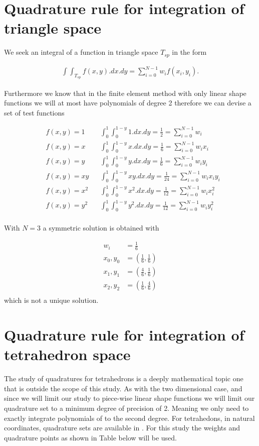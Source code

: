 \documentclass[11pt,letterpaper,titlepage]{article}
\renewcommand{\thefigure}{\arabic{section}.\arabic{figure}}
\newcommand{\beq}{\begin{equation*}
\begin{aligned}}
\newcommand{\eeq}{\end{aligned}
\end{equation*}}
\numberwithin{equation}{section}
\begin{document}
\begin{appendices}
\newpage
\renewcommand{\thefigure}{D\arabic{section}.\arabic{figure}}
\section{Quadrature rule for integration of triangle space} \label{appendix:trianglequadrature}
We seek an integral of a function in triangle space $T_{sp}$ in the form

\beq 
\int \int_{T_{sp}} f(x,y).dx.dy = \sum_{i=0}^{N-1} w_i f(x_i,y_i).
\eeq 

Furthermore we know that in the finite element method with only linear shape functions we will at most have polynomials of degree 2 therefore we can devise a set of test functions

\beq 
&f(x,y) = 1    &&\int_{0}^1 \int_0^{1-y} 1.dx.dy = \frac{1}{2} = \sum_{i=0}^{N-1} w_i\\
&f(x,y) = x    &&\int_{0}^1 \int_0^{1-y} x.dx.dy = \frac{1}{6} = \sum_{i=0}^{N-1} w_i x_i\\
&f(x,y) = y    &&\int_{0}^1 \int_0^{1-y} y.dx.dy = \frac{1}{6} = \sum_{i=0}^{N-1} w_i y_i\\
&f(x,y) = xy  & &\int_{0}^1 \int_0^{1-y} xy.dx.dy = \frac{1}{24} = \sum_{i=0}^{N-1} w_i x_i y_i\\
&f(x,y) = x^2    &&\int_{0}^1 \int_0^{1-y} x^2.dx.dy = \frac{1}{12} = \sum_{i=0}^{N-1} w_i x_i^2\\
&f(x,y) = y^2    &&\int_{0}^1 \int_0^{1-y} y^2.dx.dy = \frac{1}{12} = \sum_{i=0}^{N-1} w_i y_i^2\\
\eeq 

With $N=3$ a symmetric solution is obtained with

\beq
w_i &= \frac{1}{6} \\
x_0,y_0 &= ( \frac{1}{6}, \frac{1}{6}) \\
x_1,y_1 &= ( \frac{4}{6}, \frac{1}{6}) \\
x_2,y_2 &= ( \frac{1}{6}, \frac{4}{6}) \\
\eeq 
which is not a unique solution.


\newpage
\renewcommand{\thefigure}{D\arabic{section}.\arabic{figure}}
\section{Quadrature rule for integration of tetrahedron space} \label{appendix:tetrahedronquadrature}
The study of quadratures for tetrahedrons is a deeply mathematical topic one that is outside the scope of this study. As with the two dimensional case, and since we will limit our study to piece-wise linear shape functions we will limit our quadrature set to a minimum degree of precision of 2. Meaning we only need to exactly integrate polynomials of to the second degree. For tetrahedons, in natural coordinates, quadrature sets are available in \cite{quadraturerulestet}. For this study the weights and quadrature points as shown in Table below will be used.


\end{appendices}
\end{document}
